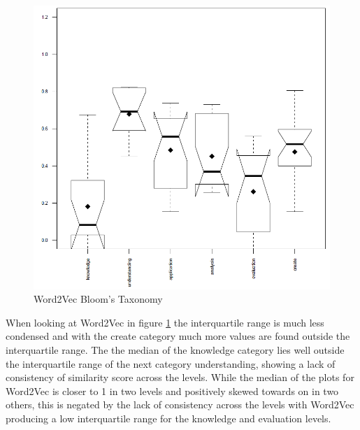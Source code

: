 \begin{figure}[H]
\centering
  \includegraphics[width=\textwidth]{images/w2v_bloom.PNG}
  \caption{Word2Vec Bloom's Taxonomy}
  \label{fig:bloom_w2v}
\end{figure}

\noindent
When looking at Word2Vec in figure \ref{fig:bloom_w2v} the interquartile range is much less condensed and with the create category much more values are found outside the interquartile range. The the median of the knowledge category lies well outside the interquartile range of the next category understanding, showing a lack of consistency of similarity score across the levels. While the median of the plots for Word2Vec is closer to 1 in two levels and positively skewed towards on in two others, this is negated by the lack of consistency across the levels with Word2Vec producing a low interquartile range for the knowledge and evaluation levels.

